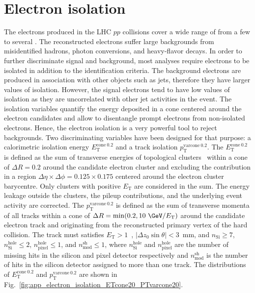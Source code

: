 \section{Electron isolation}
\label{sec:app_electron_isolation}
The electrons produced in the LHC $pp$ collisions cover a wide range of \met from a few {\GeV} to several {\TeV}.
The reconstructed electrons suffer large backgrounds from misidentified hadrons, photon conversions, and heavy-flavor decays.
In order to further discriminate signal and background, most analyses require electrons to be isolated in addition to the identification criteria.
The background electrons are produced in association with other objects such as jets, therefore they have larger values of isolation. 
However, the signal electrons tend to have low values of isolation as they are uncorrelated with other jet activities in the event.
The isolation variables quantify the energy deposited in a cone centered around the electron candidates and allow to disentangle prompt electrons from non-isolated electrons.
Hence, the electron isolation is a very powerful tool to reject backgrounds.
Two discriminating variables have been designed for that purpose: a calorimetric isolation energy $E_\mathrm{T}^\mathrm{cone\ 0.2}$ and a track isolation $p_\mathrm{T}^\mathrm{varcone\ 0.2}$.
The $E_\mathrm{T}^\mathrm{cone\ 0.2}$ is defined as the sum of transverse energies of topological clusters~\cite{Aad:2016upy} within a cone of $\Delta R = 0.2$ around the candidate electron cluster and excluding the contribution in a region $\Delta \eta \times \Delta \phi = 0.125 \times 0.175$ centered around the electron cluster barycentre.
Only clusters with positive $E_\mathrm{T}$ are considered in the sum.
The energy leakage outside the clusters, the pileup contributions, and the underlying event activity are corrected. 
The $p_\mathrm{T}^\mathrm{varcone\ 0.2}$ is defined as the sum of transverse momenta of all tracks within a cone of $\Delta R = \mathrm{min}(0.2, 10~{\GeV}/E_\mathrm{T})$ around the candidate electron track and originating from the reconstructed primary vertex of the hard collision.
The track must satisfies $E_\mathrm{T} > 1$~{\GeV}, $|\Delta z_{0} \sin \theta| < 3$~mm, and $n_\mathrm{Si} \ge 7$, $n_\mathrm{Si}^\mathrm{hole} \le 2$, $n_\mathrm{pixel}^\mathrm{hole} \le 1$, and $n_\mathrm{mod}^\mathrm{sh} \le 1$, where $n_\mathrm{Si}^\mathrm{hole}$ and $n_\mathrm{pixel}^\mathrm{hole}$ are the number of missing hits in the silicon and pixel detector respectively and $n_\mathrm{mod}^\mathrm{sh}$ is the number of hits in the silicon detector assigned to more than one track.
The distributions of $E_\mathrm{T}^\mathrm{cone\ 0.2}$ and $p_\mathrm{T}^\mathrm{varcone\ 0.2}$ are shown in Fig.~\ref{fig:app_electron_isolation_ETcone20_PTvarcone20}.

